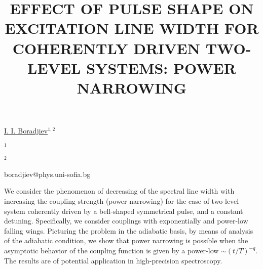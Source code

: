 \title{EFFECT OF PULSE SHAPE ON EXCITATION LINE WIDTH FOR COHERENTLY DRIVEN TWO-LEVEL SYSTEMS: POWER NARROWING}

\underline{I. I. Boradjiev}$^{1,2}$ 

{\normalsize{
\vspace{-4mm} $^{1}$\dijon

\vspace{-4mm} $^{2}$\unisofia

\email boradjiev@phys.uni-sofia.bg}}

We consider the phenomenon of decreasing of the spectral line width with increasing the coupling
strength (power narrowing) for the case of two-level system coherently driven by a bell-shaped
symmetrical pulse, and a constant detuning. Specifically, we consider couplings with exponentially and
power-low falling wings. Picturing the problem in the adiabatic basis, by means of analysis of the
adiabatic condition, we show that power narrowing is possible when the asymptotic behavior of the
coupling function is given by a power-low $\sim (t/T)^{-q}$. The results are of potential
application in high-precision spectroscopy.

\vspace{\baselineskip} 